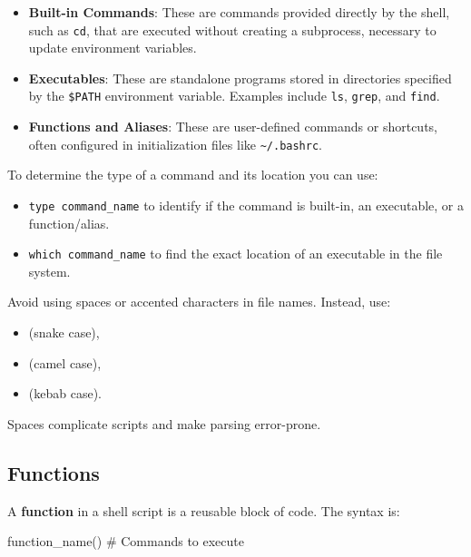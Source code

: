 \begin{itemize}
    \item \textbf{Built-in Commands}: These are commands provided directly by the shell, such as \texttt{cd}, that are executed without creating a subprocess, necessary to update environment variables.
    \item \textbf{Executables}: These are standalone programs stored in directories specified by the \texttt{\$PATH} environment variable. Examples include \texttt{ls}, \texttt{grep}, and \texttt{find}.
    \item \textbf{Functions and Aliases}: These are user-defined commands or shortcuts, often configured in initialization files like \texttt{\textasciitilde/.bashrc}.
\end{itemize}

To determine the type of a command and its location you can use:
\begin{itemize}
    \item \texttt{type command\_name} to identify if the command is built-in, an executable, or a function/alias.
    \item \texttt{which command\_name} to find the exact location of an executable in the file system.
\end{itemize}

\begin{warningblock}
    Avoid using spaces or accented characters in file names. Instead, use:
    \begin{itemize}
        \item {} (snake case),
        \item {} (camel case),
        \item {} (kebab case).
    \end{itemize}
    Spaces complicate scripts and make parsing error-prone.
\end{warningblock}

\newpage

\subsection{Functions}

A \textbf{function} in a shell script is a reusable block of code. The syntax is:
\begin{codeblock}[language=bash]
function_name() {
    # Commands to execute
}
\end{codeblock}

